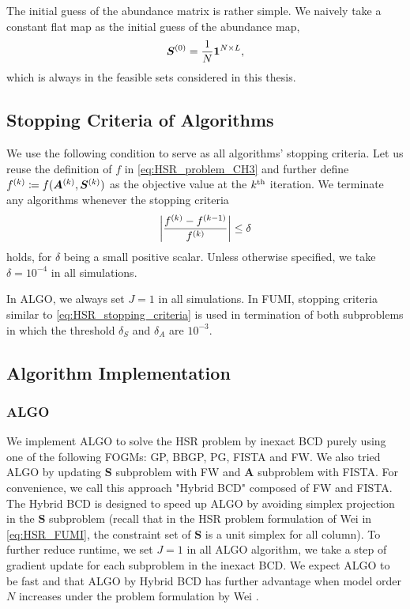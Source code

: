 The initial guess of the abundance matrix is rather simple.
We naively take a constant flat map as the initial guess of the abundance map,
\ie
\begin{equation}
    \bm S^{(0)} = \frac{1}{N} \bm 1^{N \times L},
\end{equation}
which is always in the feasible sets considered in this thesis.

\subsection{Stopping Criteria of Algorithms} \label{sec:stopping_criteria}
We use the following condition to serve as all algorithms' stopping criteria.
Let us reuse the definition of $f$ in \eqref{eq:HSR_problem_CH3} and
further define $f^{(k)} \coloneqq f(\bm A^{(k)},\bm S^{(k)})$ as the
objective value at the $k^\text{th}$ iteration.
We terminate any algorithms whenever the stopping criteria
\begin{equation}
    \left| \frac{f^{(k)} - f^{(k-1)}}{f^{(k)}} \right|
    \leq \delta
    \label{eq:HSR_stopping_criteria}
\end{equation}
holds, for $\delta$ being a small positive scalar.
Unless otherwise specified, we take $\delta = 10^{-4}$ in all simulations.

In ALGO, we always set $J = 1$ in all simulations.
In FUMI, stopping criteria similar to \eqref{eq:HSR_stopping_criteria} is used
in termination of both subproblems in which the threshold $\delta_S$ and
$\delta_A$ are $10^{-3}$.

\subsection{Algorithm Implementation}
\subsubsection{ALGO}
We implement ALGO to solve the HSR problem by inexact BCD purely using one of
the following FOGMs: GP, BBGP, PG, FISTA and FW.
We also tried ALGO by updating $\bm S$ subproblem with FW and $\bm A$
subproblem with FISTA.
For convenience, we call this approach "Hybrid BCD" composed of FW and FISTA.
The Hybrid BCD is designed to speed up ALGO by avoiding simplex projection in
the $\bm S$ subproblem (recall that in the HSR problem formulation of Wei
\etal in \eqref{eq:HSR_FUMI}, the constraint set of $\bm S$ is a unit simplex
for all column).
To further reduce runtime, we set $J = 1$ in all ALGO algorithm, \ie we take
a step of gradient update for each subproblem in the inexact BCD.
We expect ALGO to be fast and that ALGO by Hybrid BCD has further advantage
when model order $N$ increases under the problem formulation by Wei \etal.

